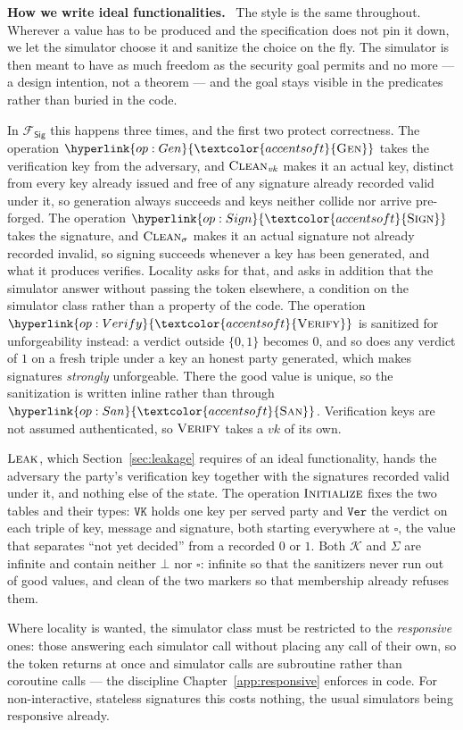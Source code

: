 \documentclass[10pt,oneside,openany]{book}
\newcommand{\op}[1]{\textnormal{\textsc{#1}}}
\newcommand{\opl}[1]{\hyperlink{op:#1}{\textcolor{accentsoft}{\op{#1}}}}
\newcommand{\Fsig}{\mathcal{F}_{\mathsf{Sig}}}
\newcommand{\vk}{\mathit{vk}}
\newcommand{\unset}{\square}
\newcommand{\Keys}{\mathcal{K}}
\newcommand{\Sigs}{\Sigma}
\newcommand{\none}{\bot}
\newcommand{\San}{\opl{San}}
\newcommand{\Clean}{\op{Clean}}
\newcommand{\V}[1]{\mathtt{#1}}
\newcommand{\heading}[1]{\medskip\par\noindent\textcolor{accent}{\textbf{#1.}}\ }
\theoremstyle{accentdef}
\theoremstyle{accentplain}
\begin{document}
\heading{How we write ideal functionalities} The style is the same throughout. Wherever a value
has to be produced and the specification does not pin it down, we let the simulator choose it and
sanitize the choice on the fly. The simulator is then meant to have as much freedom as the
security goal permits and no more --- a design intention, not a theorem --- and the goal stays
visible in the predicates rather than buried in the code.

In $\Fsig$ this happens three times, and the first two protect correctness. The operation $\opl{Gen}$ takes the
verification key from the adversary, and $\Clean_{\vk}$ makes it an actual key, distinct from
every key already issued and free of any signature already recorded valid under it, so generation
always succeeds and keys neither collide nor arrive pre-forged. The operation $\opl{Sign}$ takes the signature,
and $\Clean_{\sigma}$ makes it an actual signature not already recorded invalid, so signing
succeeds whenever a key has been generated, and what it produces verifies. Locality asks for that,
and asks in addition that the simulator answer without passing the token elsewhere, a condition on
the simulator class rather than a property of the code. The operation $\opl{Verify}$ is sanitized for
unforgeability instead: a verdict outside $\{0,1\}$ becomes $0$, and so does any verdict of $1$ on
a fresh triple under a key an honest party generated, which makes signatures \emph{strongly}
unforgeable. There the good value is unique, so the sanitization is written inline rather
than through $\San$. Verification keys are not assumed
authenticated, so $\op{Verify}$ takes a $\vk$ of its own.

$\op{Leak}$, which Section~\ref{sec:leakage} requires of an ideal functionality, hands the
adversary the party's verification key together with the signatures recorded valid under it, and
nothing else of the state. The operation $\op{Initialize}$ fixes the two tables and their types: $\V{VK}$ holds
one key per served party and $\V{Ver}$ the verdict on each triple of key, message and signature,
both starting everywhere at $\unset$, the value that separates ``not yet decided'' from a
recorded $0$ or $1$. Both $\Keys$ and $\Sigs$ are infinite and contain neither $\none$ nor
$\unset$: infinite so that the sanitizers never run out of good values, and clean of the two
markers so that membership already refuses them.

Where locality is wanted, the simulator class must be restricted to the \emph{responsive} ones:
those answering each simulator call without placing any call of their own, so the token returns
at once and simulator
calls are subroutine rather than coroutine calls --- the discipline
Chapter~\ref{app:responsive} enforces in code. For non-interactive, stateless signatures this
costs nothing, the usual simulators being responsive already.
\end{document}
